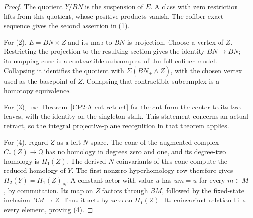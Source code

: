 \begin{proof}
The quotient $Y/BN$ is the suspension of $E$. A class with
zero restriction lifts from this quotient, whose positive
products vanish. The cofiber exact sequence gives the second
assertion in (1).

For (2), $E=BN\times Z$ and its map to $BN$ is projection.
Choose a vertex of $Z$. Restricting the projection to the
resulting section gives the identity $BN\to BN$; its mapping
cone is a contractible subcomplex of the full cofiber model.
Collapsing it identifies the quotient with
$\Sigma(BN_+\wedge Z)$, with the chosen vertex used as the
basepoint of $Z$. Collapsing that contractible subcomplex is
a homotopy equivalence.

For (3), use Theorem~\ref{CP2:A-cut-retract} for the cut
from the center to its two leaves, with the identity on the
singleton stalk. This statement concerns an actual retract,
so the integral projective-plane recognition in that theorem
applies.

For (4), regard $Z$ as a left $N$ space. The cone of the
augmented complex $C_*(Z)\to\mathbb Q$ has no homology in
degrees zero and one, and its degree-two homology is $H_1(Z)$.
The derived $N$ coinvariants of this cone compute the reduced
homology of $Y$. The first nonzero hyperhomology row therefore
gives $H_2(Y)=H_1(Z)_N$. A constant actor with value $u$ has
$u m=u$ for every $m\in M$, by commutation. Its map on $Z$
factors through $BM$, followed by the fixed-state inclusion
$BM\to Z$. Thus it acts by zero on $H_1(Z)$. Its coinvariant
relation kills every element, proving (4).
\end{proof}

